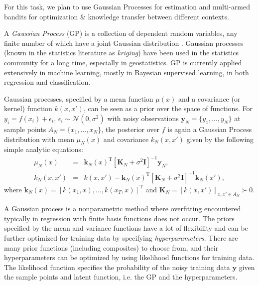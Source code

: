 \documentclass[10pt,a4paper]{article}
\begin{document}
For this task, we plan to use Gaussian Processes for estimation and multi-armed bandits for optimization \& knowledge transfer between different contexts.
\begin{scriptsize}
\begin{footnotesize}
\end{footnotesize}
\end{scriptsize}

A \textit{Gaussian Process} (GP) is a collection of dependent random variables, any finite number of which have a joint Gaussian distribution \cite{GPbook}. 
Gaussian processes (known in the statistics literature as \textit{kriging}) have been used in the statistics community for a long time, especially in geostatistics. GP is currently applied extensively in machine learning, mostly in Bayesian supervised learning, in both regression and classification.

Gaussian processes, specified by a mean function $\mu(x)$ and a covariance (or kernel) function $k(x,x')$, can be seen as a prior over the space of functions. For $y_i = f(x_i) + \epsilon_i$, $\epsilon_i \sim \mathcal{N}(0,\sigma^2)$ with noisy observations $\mathbf{y}_{N} = \{y_1,\ldots,y_N\}$ at sample points $A_N = \{x_1,\ldots,x_N\}$, the posterior over $f$ is again a Gaussian Process distribution with mean $\mu_N{(x)}$ and covariance $k_N(x,x')$ given by the following simple analytic equations:
\begin{eqnarray}
\mu_N{(x)} &=& \mathbf{k}_N(x)^{\mathrm{T}}[\mathbf{K}_N + \sigma^{2}\mathbf{I}]^{-1}\mathbf{y}_N, \label{gpUpdate_mu}\\ 
k_N(x,x') &=& k(x,x') - \mathbf{k}_N(x)^{\mathrm{T}}[\mathbf{K}_N + \sigma^{2}\mathbf{I}]^{-1} \mathbf{k}_N(x'), 
\label{gpUpdate_sigma}
\end{eqnarray}
where $\mathbf{k}_N(x) = [k(x_1,x),\ldots,k(x_T,x)]^\mathrm{T}$ and  $\mathbf{K}_N = [k(x,x')]_{x,x' \in A_N} \succ 0.$

A Gaussian process is a nonparametric method where overfitting encountered typically in regression with finite basis functions does not occur. The priors specified by the mean and variance functions have a lot of flexibility and can be further optimized for training data by specifying \textit{hyperparameters}. There are many prior functions (including composites) to choose from, and their hyperparameters can be optimized by using likelihood functions for training data.
The likelihood function specifies the probability of the noisy training data $\mathbf{y}$ given the sample points and latent function, i.e. the GP and the hyperparameters. 
\end{document}
